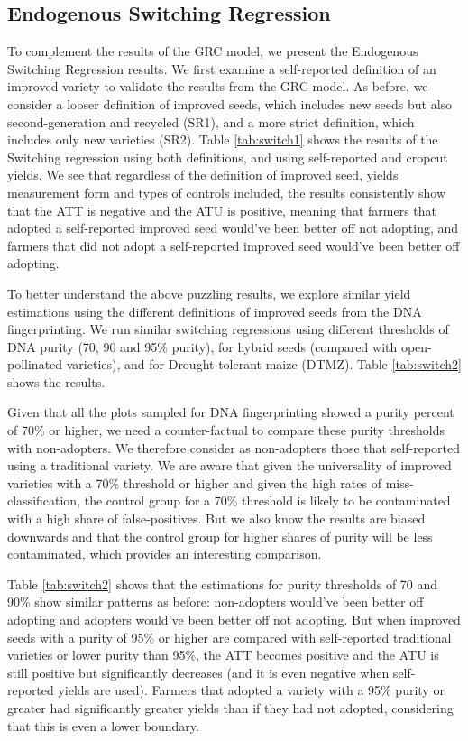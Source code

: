 \documentclass[11pt]{article}
\begin{document}
\subsection{Endogenous Switching Regression}

To complement the results of the GRC model, we present the Endogenous Switching Regression results. We first examine a self-reported definition of an improved variety to validate the results from the GRC model. As before, we consider a looser definition of improved seeds, which includes new seeds but also second-generation and recycled (SR1), and a more strict definition, which includes only new varieties (SR2). Table \ref{tab:switch1} shows the results of the Switching regression using both definitions, and using self-reported and cropcut yields. We see that regardless of the definition of improved seed, yields measurement form and types of controls included, the results consistently show that the ATT is negative and the ATU is positive, meaning that farmers that adopted a self-reported improved seed would've been better off not adopting, and farmers that did not adopt a self-reported improved seed would've been better off adopting. 



To better understand the above puzzling results, we explore similar yield estimations using the different definitions of improved seeds from the DNA fingerprinting. We run similar switching regressions using different thresholds of DNA purity (70, 90 and 95\% purity), for hybrid seeds (compared with open-pollinated varieties), and for Drought-tolerant maize (DTMZ). Table \ref{tab:switch2} shows the results. 

Given that all the plots sampled for DNA fingerprinting showed a purity percent of 70\% or higher, we need a counter-factual to compare these purity thresholds with non-adopters. We therefore consider as non-adopters those that self-reported using a traditional variety. We are aware that given the universality of improved varieties with a 70\% threshold or higher and given the high rates of miss-classification, the control group for a 70\% threshold is likely to be contaminated with a high share of false-positives. But we also know the results are biased downwards and that the control group for higher shares of purity will be less contaminated, which provides an interesting comparison. 

Table \ref{tab:switch2} shows that the estimations for purity thresholds of 70 and 90\% show similar patterns as before: non-adopters would've been better off adopting and adopters would've been better off not adopting. But when improved seeds with a purity of 95\% or higher are compared with self-reported traditional varieties or lower purity than 95\%, the ATT becomes positive and the ATU is still positive but significantly decreases (and it is even negative when self-reported yields are used). Farmers that adopted a variety with a 95\% purity or greater had significantly greater yields than if they had not adopted, considering that this is even a lower boundary. 
\end{document}

